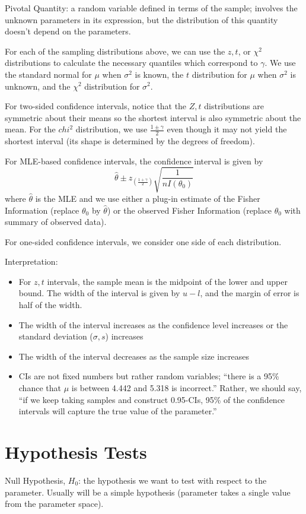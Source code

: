 \documentclass[letterpaper, 8pt]{extarticle}
\begin{document}
\begin{multicols*}{3}
    Pivotal Quantity: a random variable defined in terms of the sample; involves the unknown parameters in its expression, but the distribution of this quantity doesn't depend on the parameters.

    For each of the sampling distributions above, we can use the $z, t$, or $\chi^2$ distributions to calculate the necessary quantiles which correspond to $\gamma$. We use the standard normal for $\mu$ when $\sigma^2$ is known, the $t$ distribution for $\mu$ when $\sigma^2$ is unknown, and the $\chi^2$ distribution for $\sigma^2$. 
    
    For two-sided confidence intervals, notice that the $Z,t$ distributions are symmetric about their means so the shortest interval is also symmetric about the mean. For the $chi^2$ distribution, we use $\frac{1\pm\gamma}{2}$ even though it may not yield the shortest interval (its shape is determined by the degrees of freedom).

    For MLE-based confidence intervals, the confidence interval is given by
    \[\hat\theta\pm z_{(\frac{1+\gamma}{2})}\sqrt{\frac{1}{nI(\theta_0)}}\]
    where $\hat\theta$ is the MLE and we use either a plug-in estimate of the Fisher Information (replace $\theta_0$ by $\hat\theta$) or the observed Fisher Information (replace $\theta_0$ with summary of observed data).

    For one-sided confidence intervals, we consider one side of each distribution.

    Interpretation:
    \begin{itemize}
        \item For $z,t$ intervals, the sample mean is the midpoint of the lower and upper bound. The width of the interval is given by $u-l$, and the margin of error is half of the width.
        \item The width of the interval increases as the confidence level increases or the standard deviation ($\sigma,s$) increases
        \item The width of the interval decreases as the sample size increases
        \item CIs are not fixed numbers but rather random variables; ``there is a 95\% chance that $\mu$ is between 4.442 and 5.318 is incorrect.'' Rather, we should say, ``if we keep taking samples and construct 0.95-CIs, 95\% of the confidence intervals will capture the true value of the parameter.''
	\end{itemize}
	
	\section{Hypothesis Tests}
	Null Hypothesis, $H_0$: the hypothesis we want to test with respect to the parameter. Usually will be a simple hypothesis (parameter takes a single value from the parameter space).


\end{multicols*}
\end{document}
